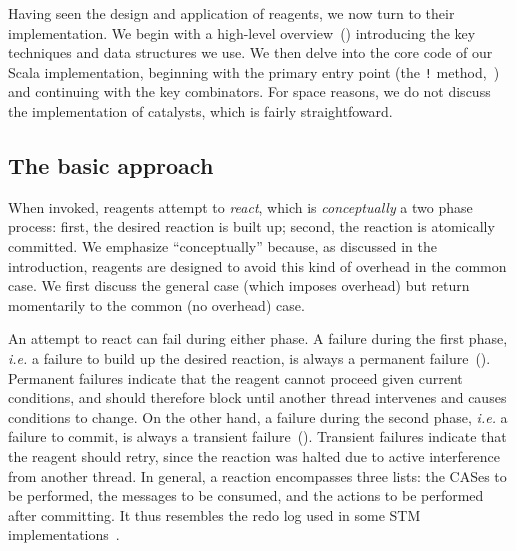 \documentclass[preprint,nocopyrightspace]{sigplanconf}
\begin{document}
Having seen the design and application of reagents, we now turn to their
implementation.  We begin with a high-level overview~()
introducing the key techniques and data structures we use.  We then delve into
the core code of our Scala implementation, beginning with the primary entry
point (the \lstinline{!} method,~) and continuing with the
key combinators.  For space reasons, we do not discuss the implementation of
catalysts, which is fairly straightfoward.

\subsection{The basic approach}
\label{sec:impl-approach}

When invoked, reagents attempt to \emph{react}, which is \emph{conceptually} a
two phase process: first, the desired reaction is built up; second, the reaction
is atomically committed.  We emphasize ``conceptually'' because, as discussed in
the introduction, reagents are designed to avoid this kind of overhead in the
common case.  We first discuss the general case (which imposes overhead) but
return momentarily to the common (no overhead) case.

An attempt to react can fail during either phase.  A failure during the first
phase, \emph{i.e.} a failure to build up the desired reaction, is always a
permanent failure~().  Permanent failures indicate that the
reagent cannot proceed given current conditions, and should therefore block
until another thread intervenes and causes conditions to change.  On the other
hand, a failure during the second phase, \emph{i.e.} a failure to commit, is
always a transient failure~().  Transient failures indicate that
the reagent should retry, since the reaction was halted due to active
interference from another thread.  
In general, a reaction encompasses three lists: the CASes to be performed, the
messages to be consumed, and the actions to be performed after committing.  It
thus resembles the redo log used in some STM implementations~\cite{Larus2006}.
\end{document}
